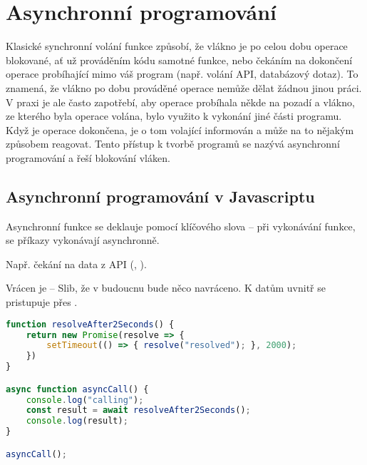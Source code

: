 
\section{Asynchronní programování}

Klasické synchronní volání funkce způsobí, že vlákno je po celou dobu operace blokované, ať už prováděním kódu samotné funkce, nebo čekáním na dokončení operace probíhající mimo váš program (např. volání API, databázový dotaz). To znamená, že vlákno po dobu prováděné operace nemůže dělat žádnou jinou práci. V praxi je ale často zapotřebí, aby operace probíhala někde na pozadí a vlákno, ze kterého byla operace volána, bylo využito k vykonání jiné části programu. Když je operace dokončena, je o tom volající informován a může na to nějakým způsobem reagovat. Tento přístup k tvorbě programů se nazývá asynchronní programování a řeší blokování vláken.

\subsection{Asynchronní programování v Javascriptu}

\begin{compactitem}
    \item Asynchronní funkce se deklauje pomocí klíčového slova  -- při vykonávání funkce, se příkazy vykonávají asynchronně.
    \item Např. čekání na data z API (, ).
    \item Vrácen je  -- Slib, že v budoucnu bude něco navráceno. K datům uvnitř  se pristupuje přes .
\end{compactitem}

\noindent\begin{minipage}{\linewidth}
\begin{lstlisting}[language=javascript, caption={Příklad asynchronního programování, async + await.}]
function resolveAfter2Seconds() {
    return new Promise(resolve => {
        setTimeout(() => { resolve("resolved"); }, 2000);
    })
}

async function asyncCall() {
    console.log("calling");
    const result = await resolveAfter2Seconds();
    console.log(result);
}

asyncCall();
\end{lstlisting}
\end{minipage}

